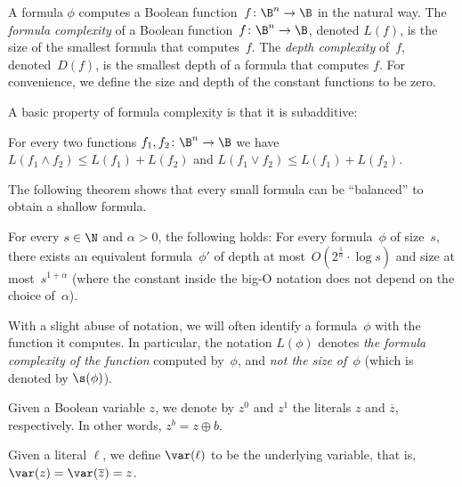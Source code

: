 \documentclass{toc}
\begin{document}
\begin{definition}
A formula $\phi$ computes a Boolean function~$f\colon\B^{n}\to\B$
in the natural way. The \emph{formula complexity} of a Boolean function~$f\colon\B^{n}\to\B$,
denoted $L(f)$, is the size of the smallest formula that computes~$f$.
The \emph{depth complexity} of~$f$, denoted~$D(f)$, is the smallest
depth of a formula that computes $f$. For convenience, we define
the size and depth of the constant functions to be zero. 
\end{definition}

A basic property of formula complexity is that it is subadditive: 
\begin{fact}
\label{fact:subadditivity}For every two functions $f_{1},f_{2}\colon\B^{n}\to\B$
we have $L(f_{1}\wedge f_{2})\le L(f_{1})+L(f_{2})$ and $L(f_{1}\vee f_{2})\le L(f_{1})+L(f_{2})$. 
\end{fact}

The following theorem shows that every small formula can be ``balanced''
to obtain a shallow formula. 
\begin{theorem}
\label{thm:size-depth-tradeoff}For every $s \in \N$ and $\alpha>0$, the following
holds: For every formula~$\phi$ of size~$s$, there exists an equivalent
formula~$\phi'$ of depth at most~$O(2^{\frac{1}{\alpha}}\cdot\log s)$
and size at most~$s^{1+\alpha}$ (where the constant inside the big-O
notation does not depend on the choice of~$\alpha$).
\end{theorem}

\begin{notation}
With a slight abuse of notation, we will often identify a formula~$\phi$
with the function it computes. In particular, the notation $L(\phi)$
denotes \emph{the formula complexity of the function} computed by~$\phi$,
and \emph{not the size of~$\phi$} (which is denoted by $\s(\phi)$). 
\end{notation}

\begin{notation}
Given a Boolean variable $z$, we denote by $z^{0}$ and $z^{1}$
the literals $z$ and $\overline{z}$, respectively. In other words,
$z^{b}=z\oplus b$. 
\end{notation}

\begin{notation}
Given a literal $\ell$, we define $\var(\ell)$ to be the underlying
variable, that is, $\var(z)=\var(\overline{z})=z$. 
\end{notation}
\end{document}

